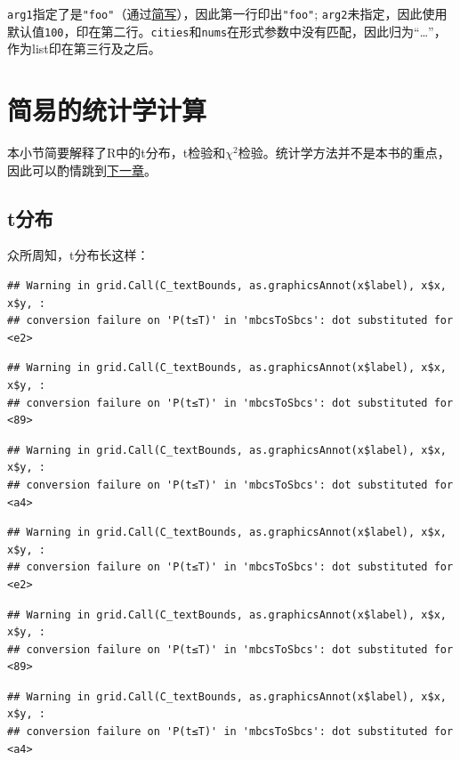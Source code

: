 \documentclass[]{book}
\begin{document}
\texttt{arg1}指定了是\texttt{"foo"}（通过\protect\hyperlink{abbr}{简写}），因此第一行印出\texttt{"foo"}; \texttt{arg2}未指定，因此使用默认值\texttt{100}，印在第二行。\texttt{cities}和\texttt{nums}在形式参数中没有匹配，因此归为``\ldots{}''，作为list印在第三行及之后。

\section{简易的统计学计算}

本小节简要解释了R中的t分布，t检验和\(\chi^2\)检验。统计学方法并不是本书的重点，因此可以酌情跳到\protect\hyperlink{tibble}{下一章}。

\hypertarget{t}{%
\subsection{t分布}\label{t}}

众所周知，t分布长这样：

\begin{verbatim}
## Warning in grid.Call(C_textBounds, as.graphicsAnnot(x$label), x$x, x$y, :
## conversion failure on 'P(t≤T)' in 'mbcsToSbcs': dot substituted for <e2>
\end{verbatim}

\begin{verbatim}
## Warning in grid.Call(C_textBounds, as.graphicsAnnot(x$label), x$x, x$y, :
## conversion failure on 'P(t≤T)' in 'mbcsToSbcs': dot substituted for <89>
\end{verbatim}

\begin{verbatim}
## Warning in grid.Call(C_textBounds, as.graphicsAnnot(x$label), x$x, x$y, :
## conversion failure on 'P(t≤T)' in 'mbcsToSbcs': dot substituted for <a4>
\end{verbatim}

\begin{verbatim}
## Warning in grid.Call(C_textBounds, as.graphicsAnnot(x$label), x$x, x$y, :
## conversion failure on 'P(t≤T)' in 'mbcsToSbcs': dot substituted for <e2>
\end{verbatim}

\begin{verbatim}
## Warning in grid.Call(C_textBounds, as.graphicsAnnot(x$label), x$x, x$y, :
## conversion failure on 'P(t≤T)' in 'mbcsToSbcs': dot substituted for <89>
\end{verbatim}

\begin{verbatim}
## Warning in grid.Call(C_textBounds, as.graphicsAnnot(x$label), x$x, x$y, :
## conversion failure on 'P(t≤T)' in 'mbcsToSbcs': dot substituted for <a4>
\end{verbatim}
\end{document}
